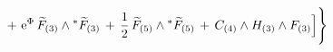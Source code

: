 \begin{equation}
+ \,\,{\rm e}^{\Phi} \,{\widetilde{F}}_{(3)} \wedge {}^*
{\widetilde{F}}_{(3)} \,+\, \frac{1}{2}\, {\widetilde{F}}_{(5)} \wedge
{}^* {\widetilde{F}}_{(5)}  \, + \,  C_{(4)} \wedge H_{(3)} \wedge
F_{(3)} \Big] \Bigg\}
\label{SIIb}
\end{equation}

